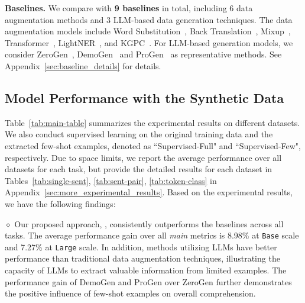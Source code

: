 
\textbf{Baselines.}
We compare {\ours} with \textbf{9 baselines} in total, including
6 data augmentation methods and 3 LLM-based data generation techniques. The data augmentation models include Word Substitution~\citep{checklist}, Back Translation~\citep{uda}, Mixup~\citep{chen2020mixtext,seqmix}, Transformer~\citep{kumar2020data,melm}, LightNER~\citep{lightner}, and KGPC~\citep{chen2023few}.
For LLM-based generation models, we consider ZeroGen~\citep{ye2022zerogen}, DemoGen~\citep{meng2023tuning,gpt3mix} and ProGen~\citep{ye2022progen} as representative methods. See Appendix~\ref{sec:baseline_details} for details.


\subsection{Model Performance with the Synthetic Data}
\label{sec:model_perf}

Table~\ref{tab:main-table} summarizes the experimental results on different datasets. We also conduct supervised learning on the original training data and the extracted few-shot examples, denoted as ``Supervised-Full" and ``Supervised-Few", respectively.
Due to space limits, we report the average performance over all datasets for each task, but provide the detailed results for each dataset in Tables~\ref{tab:single-sent}, \ref{tab:sent-pair}, \ref{tab:token-class} in Appendix~\ref{sec:more_experimental_results}. 
Based on the experimental results, we have the following findings:

\noindent $\diamond$ Our proposed approach, {\ours}, consistently outperforms the baselines across all tasks. The average performance gain over all \textit{main} metrics is 8.98\% at \texttt{Base} scale and 7.27\% at \texttt{Large} scale. In addition, methods utilizing LLMs have better performance than traditional data augmentation techniques, illustrating the capacity of LLMs to extract valuable information from limited examples. The performance gain of DemoGen and ProGen over ZeroGen further demonstrates the positive influence of few-shot examples on overall comprehension.

